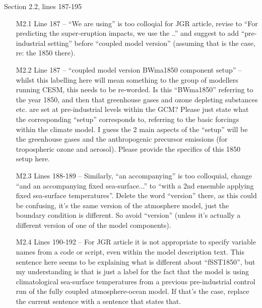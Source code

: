 \documentclass{reviewresponse}
\begin{document}
  \begin{revcomment}[after title={: M2},colframe={colorcommentresolved}]
    Section 2.2, lines 187-195

    \begin{enumerate}
      \item
      [M2.1] Line 187 -- ``We are using'' is too colloqial for JGR article, revise to
      ``For predicting the super-eruption impacts, we use the ..'' and suggest to add
      ``pre-industrial setting'' before ``coupled model version'' (assuming that is the
      case, re: the 1850 there).
      \item
      [M2.2] Line 187 -- ``coupled model version BWma1850 component setup'' -- whilst
      this labelling here will mean something to the group of modellers running CESM,
      this needs to be re-worded. Is this ``BWma1850'' referring to the year 1850, and
      then that greenhouse gases and ozone depleting substances etc. are set at
      pre-industrial levels within the GCM? Please just state what the corresponding
      ``setup'' corresponds to, referring to the basic forcings within the climate
      model. I guess the 2 main aspects of the ``setup'' will be the greenhouse gases
      and the anthropogenic precursor emissions (for tropospheric ozone and aerosol).
      Please provide the specifics of this 1850 setup here.
      \item
      [M2.3] Lines 188-189 -- Similarly, ``an accompanying'' is too colloquial, change
      ``and an accompanying fixed sea-surface...'' to ``with a 2nd ensemble applying
      fixed sea-surface temperatures''. Delete the word ``version'' there, as this could
      be confusing, it's the same version of the atmosphere model, just the boundary
      condition is different. So avoid ``version'' (unless it's actually a different
      version of one of the model components).
      \item
      [M2.4] Lines 190-192 -- For JGR article it is not appropriate to specify variable
      names from a code or script, even within the model description text. This sentence
      here seems to be explaining what is different about ``fSST1850'', but my
      understanding is that is just a label for the fact that the model is using
      climatological sea-surface temperatures from a previous pre-industrial control run
      of the fully coupled atmosphere-ocean model. If that's the case, replace the
      current sentence with a sentence that states that.
    \end{enumerate}
  \end{revcomment}
\end{document}

